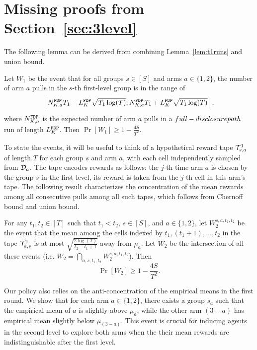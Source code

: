 \section{Missing proofs from Section~\ref{sec:3level}}
\label{sec:3level-pfs}


The following lemma can be derived from combining Lemma~\ref{lem:t1runs} and union bound.

\begin{lemma}\label{3levelw1}
  Let $W_1$ be the event that for all groups $s\in [S]$ and arms
  $a\in \{1, 2\}$, the number of arm $a$ pulls in the $s$-th
  first-level group is in the range of
  $$
  \left[N^\mathtt{FDP}_{K,a}  T_1- L^\mathtt{FDP}_K \sqrt{T_1\log(T)}, N^\mathtt{FDP}_{K,a}  T_1 + L^\mathtt{FDP}_K \sqrt{T_1\log(T)}\right],
  $$
  where $N^\mathtt{FDP}_{K,a} $ is the expected number of arm $a$ pulls in a $full-disclosure path$ run
  of length $L^\mathtt{FDP}_K$. Then $\Pr[W_1] \geq 1- \frac{4S}{T^2}$.
\end{lemma}

To state the events, it will be useful to think of a
hypothetical reward tape $\mathcal{T}^1_{s, a}$ of length $T$ for each
group $s$ and arm $a$, with each cell independently sampled from
$\mathcal{D}_a$.  The tape encodes rewards as follows: the $j$-th time arm $a$
is chosen by the group $s$ in the first level, its reward is taken
from the $j$-th cell in this arm's tape. The following result
characterizes the concentration of the mean rewards among all
consecutive pulls among all such tapes, which follows from Chernoff
bound and union bound.

\begin{lemma}\label{3levelw2}
  For any $t_1, t_2\in [T]$ such that $t_1 < t_2$, $s\in [S]$, and
  $a\in \{1,2\}$, let $W_2^{s,a,t_1,t_2}$ be the event that the mean
  among the cells indexed by $t_1, (t_1+1), \ldots, t_2$ in the tape
  $\mathcal{T}^1_{a, s}$ is at most $\sqrt{\frac{2\log(T)}{t_2-t_1+1}}$ away
  from $\mu_a$.  Let $W_2$ be the intersection of all these events
  (i.e.  $W_2 = \bigcap_{a,s,t_1,t_2} W_2^{s,a,t_1,t_2}$). Then
  \[
    \Pr[W_2] \geq 1- \frac{4S}{T^2}.
  \]
\end{lemma}

Our policy also relies on the anti-concentration of the empirical
means in the first round. We show that for each arm $a\in \{1, 2\}$,
there exists a group $s_a$ such that the empirical mean of $a$ is
slightly above $\mu_a$, while the other arm $(3 - a)$ has empirical
mean slightly below $\mu_{(3-a)}$. This event is crucial for inducing
agents in the second level to explore both arms when the their
mean rewards are indistinguishable after the first level.


